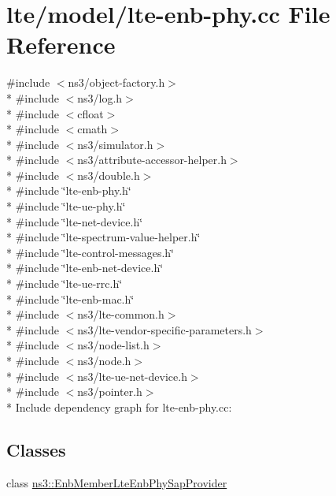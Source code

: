 \hypertarget{lte-enb-phy_8cc}{}\section{lte/model/lte-\/enb-\/phy.cc File Reference}
\label{lte-enb-phy_8cc}
{\ttfamily \#include $<$ns3/object-\/factory.\+h$>$}\\*
{\ttfamily \#include $<$ns3/log.\+h$>$}\\*
{\ttfamily \#include $<$cfloat$>$}\\*
{\ttfamily \#include $<$cmath$>$}\\*
{\ttfamily \#include $<$ns3/simulator.\+h$>$}\\*
{\ttfamily \#include $<$ns3/attribute-\/accessor-\/helper.\+h$>$}\\*
{\ttfamily \#include $<$ns3/double.\+h$>$}\\*
{\ttfamily \#include \char`\"{}lte-\/enb-\/phy.\+h\char`\"{}}\\*
{\ttfamily \#include \char`\"{}lte-\/ue-\/phy.\+h\char`\"{}}\\*
{\ttfamily \#include \char`\"{}lte-\/net-\/device.\+h\char`\"{}}\\*
{\ttfamily \#include \char`\"{}lte-\/spectrum-\/value-\/helper.\+h\char`\"{}}\\*
{\ttfamily \#include \char`\"{}lte-\/control-\/messages.\+h\char`\"{}}\\*
{\ttfamily \#include \char`\"{}lte-\/enb-\/net-\/device.\+h\char`\"{}}\\*
{\ttfamily \#include \char`\"{}lte-\/ue-\/rrc.\+h\char`\"{}}\\*
{\ttfamily \#include \char`\"{}lte-\/enb-\/mac.\+h\char`\"{}}\\*
{\ttfamily \#include $<$ns3/lte-\/common.\+h$>$}\\*
{\ttfamily \#include $<$ns3/lte-\/vendor-\/specific-\/parameters.\+h$>$}\\*
{\ttfamily \#include $<$ns3/node-\/list.\+h$>$}\\*
{\ttfamily \#include $<$ns3/node.\+h$>$}\\*
{\ttfamily \#include $<$ns3/lte-\/ue-\/net-\/device.\+h$>$}\\*
{\ttfamily \#include $<$ns3/pointer.\+h$>$}\\*
Include dependency graph for lte-\/enb-\/phy.cc\+:
\subsection*{Classes}
\begin{DoxyCompactItemize}
\item 
class \hyperlink{classns3_1_1EnbMemberLteEnbPhySapProvider}{ns3\+::\+Enb\+Member\+Lte\+Enb\+Phy\+Sap\+Provider}
\end{DoxyCompactItemize}
